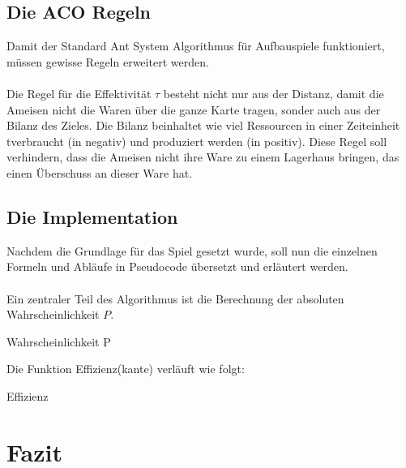 \documentclass[12pt]{article}
\begin{document}
\subsection{Die ACO Regeln}
Damit der Standard Ant System Algorithmus für Aufbauspiele funktioniert, müssen gewisse Regeln erweitert werden. \\\\
Die Regel für die Effektivität $\tau$ besteht nicht nur aus der Distanz, damit die Ameisen nicht die Waren über die ganze Karte tragen, sonder auch aus der Bilanz des Zieles. Die Bilanz beinhaltet wie viel Ressourcen in einer Zeiteinheit t\footnotemark[3] verbraucht (in negativ) und produziert werden (in positiv). Diese Regel soll verhindern, dass die Ameisen nicht ihre Ware zu einem Lagerhaus bringen, das einen Überschuss an dieser Ware hat.

\subsection{Die Implementation}
Nachdem die Grundlage für das Spiel gesetzt wurde, soll nun die einzelnen Formeln und Abläufe in Pseudocode übersetzt und erläutert werden. \\\\
Ein zentraler Teil des Algorithmus ist die Berechnung der absoluten Wahrscheinlichkeit $P$. 
\begin{algorithm}
 \caption{Wahrscheinlichkeit P}
 \DontPrintSemicolon

\end{algorithm}
Die Funktion Effizienz(kante) verläuft wie folgt:
\begin{algorithm}
\caption{Effizienz}
\DontPrintSemicolon
{}
\end{algorithm}
\section{Fazit}


\nocite{*}
\printbibliography
\end{document}
